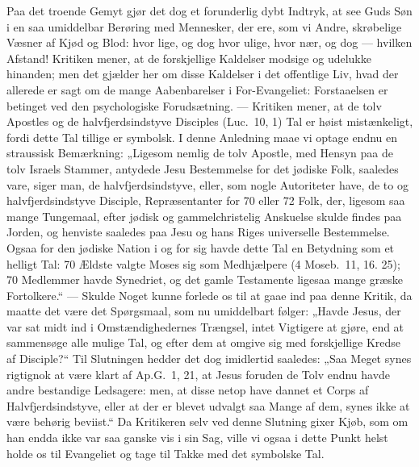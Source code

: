 \documentclass[12pt,a4paper]{book}
\begin{document}
Paa det troende Gemyt gjør det dog et forunderlig dybt Indtryk, at see Guds Søn
i en saa umiddelbar Berøring med Mennesker, der ere, som vi Andre, skrøbelige
Væsner af Kjød og Blod: hvor lige, og dog hvor ulige, hvor nær, og dog ---
hvilken Afstand! Kritiken mener, at de forskjellige Kaldelser modsige og udelukke
hinanden; men det gjælder her om disse Kaldelser i det offentlige Liv, hvad der
allerede er sagt om de mange Aabenbarelser i For-Evangeliet: Forstaaelsen er
betinget ved den psychologiske Forudsætning. --- Kritiken mener, at de tolv
Apostles og de
halvfjerdsindstyve Disciples (Luc.\ 10, 1) Tal er høist mistænkeligt, fordi dette
Tal tillige er symbolsk. I denne Anledning maae vi optage endnu en straussisk
Bemærkning: „Ligesom nemlig de tolv Apostle, med Hensyn paa de tolv Israels
Stammer, antydede Jesu Bestemmelse for det jødiske Folk, saaledes vare, siger
man, de halvfjerdsindstyve, eller, som nogle Autoriteter have, de to og
halvfjerdsindstyve Disciple, Repræsentanter for 70 eller 72 Folk, der, ligesom
saa mange Tungemaal, efter jødisk og gammelchristelig Anskuelse skulde findes paa
Jorden, og henviste saaledes paa Jesu og hans Riges universelle Bestemmelse.
Ogsaa for den jødiske Nation i og for sig havde dette Tal en Betydning som et
helligt Tal: 70 Ældste valgte Moses sig som Medhjælpere (4 Moseb.\ 11, 16. 25);
70 Medlemmer havde Synedriet, og det gamle Testamente ligesaa mange græske
Fortolkere.“ --- Skulde Noget kunne forlede os til at gaae ind paa denne Kritik,
da maatte det være det Spørgsmaal, som nu umiddelbart følger: „Havde Jesus, der
var sat midt ind i Omstændighedernes Trængsel, intet Vigtigere at gjøre, end at
sammensøge alle mulige Tal, og efter dem at omgive sig med forskjellige Kredse af
Disciple?“ Til Slutningen hedder det dog imidlertid saaledes: „Saa Meget synes
rigtignok at være klart af Ap.G.\ 1, 21, at Jesus foruden de Tolv endnu havde
andre bestandige Ledsagere: men, at disse netop have dannet et Corps af
Halvfjerdsindstyve, eller at der er blevet udvalgt saa Mange af dem, synes ikke
at være behørig beviist.“ Da Kritikeren selv ved denne Slutning gixer Kjøb, som
om han endda ikke var saa ganske vis i sin Sag, ville vi ogsaa i dette Punkt
helst holde os til Evangeliet og tage til Takke med det symbolske Tal.
\end{document}
